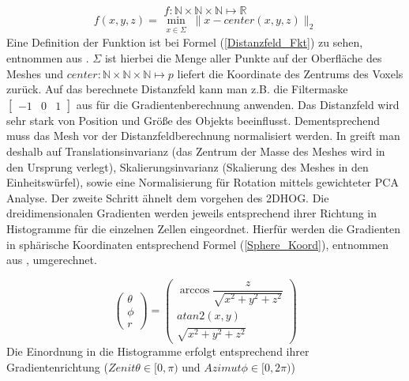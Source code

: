 \begin{equation*}
f: \mathbb{N} \times \mathbb{N} \times \mathbb{N} \mapsto \mathbb{R} 
\end{equation*}
\begin{equation}
\label{Distanzfeld_Fkt}
f(x,y,z) = \min_{\substack{x \in \Sigma}} \| x-center(x,y,z) \|_2
\end{equation}
Eine Definition der Funktion ist bei Formel (\ref{Distanzfeld_Fkt}) zu sehen, entnommen aus \cite{scherer2010histograms}. $\Sigma$ ist hierbei die Menge aller Punkte auf der Oberfläche des Meshes und $center: \mathbb{N} \times \mathbb{N} \times \mathbb{N} \mapsto p $ liefert die Koordinate des Zentrums des Voxels zurück.
\newline
Auf das berechnete Distanzfeld kann man z.B. die Filtermaske $\begin{bmatrix} -1 & 0 & 1\end{bmatrix}$ aus \cite{dalal2005histograms} für die Gradientenberechnung anwenden.
\newline
Das Distanzfeld wird sehr stark von Position und Größe des Objekts beeinflusst. Dementsprechend muss das Mesh vor der Distanzfeldberechnung normalisiert werden. In \cite{scherer2010histograms} greift man deshalb auf Translationsinvarianz  (das Zentrum der Masse des Meshes wird in den Ursprung verlegt), Skalierungsinvarianz (Skalierung des Meshes in den Einheitswürfel), sowie eine Normalisierung für Rotation mittels gewichteter PCA Analyse.
\newline
Der zweite Schritt ähnelt dem vorgehen des 2DHOG. Die dreidimensionalen Gradienten werden jeweils entsprechend ihrer Richtung in Histogramme für die einzelnen Zellen eingeordnet. Hierfür werden die Gradienten in sphärische Koordinaten entsprechend Formel (\ref{Sphere_Koord}), entnommen aus \cite{scherer2010histograms}, umgerechnet.

\begin{equation}
\label{Sphere_Koord}
\begin{pmatrix}
	\theta \\ 
	 \phi \\ 
	 r
\end{pmatrix}
= \begin{pmatrix}
	\arccos\dfrac{z}{\sqrt{x^2+y^2+z^2}} \\ 
	 atan2(x,y) \\ 
	 \sqrt{x^2+y^2+z^2}
\end{pmatrix}
\end{equation}
Die Einordnung in die Histogramme erfolgt entsprechend ihrer Gradientenrichtung ($Zenit \theta \in [0,\pi) $ und $Azimut \phi \in [0,2\pi)$)  

